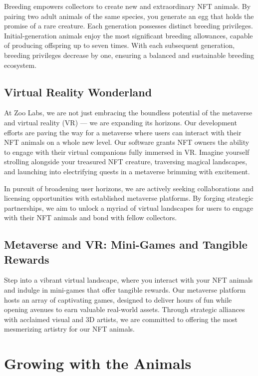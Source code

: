 Breeding empowers collectors to create new and extraordinary NFT animals. By pairing two adult animals of the same species, you generate an egg that holds the promise of a rare creature. Each generation possesses distinct breeding privileges. Initial-generation animals enjoy the most significant breeding allowances, capable of producing offspring up to seven times. With each subsequent generation, breeding privileges decrease by one, ensuring a balanced and sustainable breeding ecosystem.

\subsection{Virtual Reality Wonderland}

At Zoo Labs, we are not just embracing the boundless potential of the metaverse and virtual reality (VR) --- we are expanding its horizons. Our development efforts are paving the way for a metaverse where users can interact with their NFT animals on a whole new level. Our software grants NFT owners the ability to engage with their virtual companions fully immersed in VR. Imagine yourself strolling alongside your treasured NFT creature, traversing magical landscapes, and launching into electrifying quests in a metaverse brimming with excitement.

In pursuit of broadening user horizons, we are actively seeking collaborations and licensing opportunities with established metaverse platforms. By forging strategic partnerships, we aim to unlock a myriad of virtual landscapes for users to engage with their NFT animals and bond with fellow collectors.

\subsection{Metaverse and VR: Mini-Games and Tangible Rewards}

Step into a vibrant virtual landscape, where you interact with your NFT animals and indulge in mini-games that offer tangible rewards. Our metaverse platform hosts an array of captivating games, designed to deliver hours of fun while opening avenues to earn valuable real-world assets. Through strategic alliances with acclaimed visual and 3D artists, we are committed to offering the most mesmerizing artistry for our NFT animals.

\section{Growing with the Animals}
\label{sec:growing}

